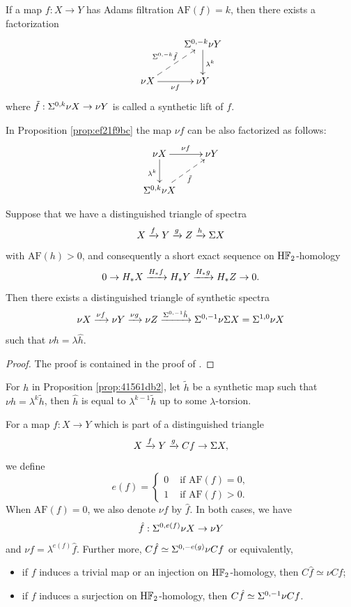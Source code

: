 \documentclass{amsart}
\numberwithin{equation}{section}
\newcommand{\AF}{\mathrm{AF}}
\newcommand{\HF}{\mathrm{H}\bF_2}
\begin{document}
\begin{proposition}\label{prop:ef21f9bc}
    If a map $f:X\to Y$ has Adams filtration $\AF(f)=k$, then there exists a factorization
    $$\xymatrix{
     & \Sus^{0,-k}\nu Y\ar[d]^{\lambda^k}\\
     \nu X \ar[r]_{\nu f}\ar@{-->}[ru]^{\Sus^{0,-k}\tilde f} & \nu Y
    }$$
    where $\tilde f: \Sigma^{0,k}\nu X\to \nu Y$ is called a synthetic lift of $f$.
\end{proposition}

In Proposition \ref{prop:ef21f9bc} the map $\nu f$ can be also factorized as follows:
$$\xymatrix{
 \nu X \ar[r]^{\nu f}\ar[d]_{\lambda^k} & \nu Y\\
 \Sus^{0,k}\nu X\ar@{-->}[ru]_{\tilde f}
}$$


\begin{proposition}\label{prop:41561db2}
    Suppose that we have a  distinguished triangle of spectra
    $$X\xrightarrow{f} Y\xrightarrow{g} Z\xrightarrow{h} \Sigma X$$
    with $\AF(h)>0$, and consequently a short exact sequence on $\HF$-homology
    $$0\to H_*X\xrightarrow{H_*f} H_*Y\xrightarrow{H_*g} H_*Z\to 0.$$
    Then there exists a distinguished triangle of synthetic spectra
    $$\nu X\xrightarrow{\nu f}\nu Y\xrightarrow{\nu g} \nu Z\xrightarrow{\Sigma^{0,-1}\hat h} \Sigma^{0,-1}\nu \Sigma X=\Sigma^{1,0}\nu X$$
    such that $\nu h=\lambda \hat h$.
\end{proposition}
\begin{proof}
    The proof is contained in the proof of \cite[Lemma 9.15]{BHS}.
\end{proof}

\begin{remark}
For $h$ in Proposition \ref{prop:41561db2}, let $\tilde h$ be a synthetic map such that $\nu h=\lambda^k\tilde h$, then $\hat h$ is equal to $\lambda^{k-1}\tilde h$ up to some $\lambda$-torsion. 
\end{remark}

\begin{notation} \label{not:fhat}
     For a map $f: X\to Y$ which is part of a distinguished triangle
    $$X\xrightarrow{f} Y\xrightarrow{g}Cf\to\Sigma X,$$
    we define
    $$e(f)=\begin{cases}
     0 & \text{ if }\AF(f)=0,\\
     1 & \text{ if }\AF(f)>0.
    \end{cases}$$
    When $\AF(f)=0$, we also denote $\nu f$ by $\hat f$. In both cases, we have 
    $$\hat f: \Sigma^{0,e(f)}\nu X\to \nu Y$$
    and $\nu f=\lambda^{e(f)}\hat f$. Further more, $C\hat f\simeq \Sigma^{0,-e(g)}\nu Cf$ or equivalently,
    \begin{itemize}
        \item if $f$ induces a trivial map or an injection on $\HF$-homology, then $C\hat f\simeq \nu Cf$;
        \item if $f$ induces a surjection on $\HF$-homology, then $C\hat f \simeq \Sigma^{0,-1}\nu Cf$.
    \end{itemize}
\end{notation}
\end{document}

